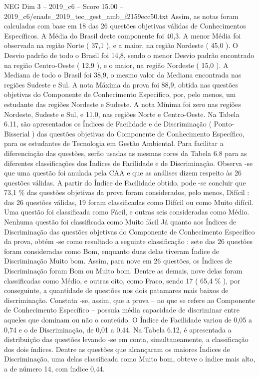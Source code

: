\begin{textsample}{NEG Dim 3 – 2019\_c6 – Score 15.00 – 2019\_c6/enade\_2019\_tec\_gest\_amb\_f2159ecc50.txt}
Assim, as notas foram calculadas com base em 18 das 26 questões objetivas válidas de Conhecimentos Específicos.
A Média do Brasil deste componente foi 40,3.
A menor Média foi observada na região Norte ( 37,1 ), e a maior, na região Nordeste ( 45,0 ).
O Desvio padrão de todo o Brasil foi 14,8, sendo o menor Desvio padrão encontrado na região Centro-Oeste ( 12,9 ), e o maior, na região Nordeste ( 15,0 ).
A Mediana de todo o Brasil foi 38,9, o mesmo valor da Mediana encontrada nas regiões Sudeste e Sul.
A nota Máxima da prova foi 88,9, obtida nas questões objetivas do Componente de Conhecimento Específico, por, pelo menos, um estudante das regiões Nordeste e Sudeste.
A nota Mínima foi zero nas regiões Nordeste, Sudeste e Sul, e 11,0, nas regiões Norte e Centro-Oeste.
Na Tabela 6.11, são apresentados os Índices de Facilidade e de Discriminação ( Ponto-Bisserial ) das questões objetivas do Componente de Conhecimento Específico, para os estudantes de Tecnologia em Gestão Ambiental.
Para facilitar a diferenciação das questões, serão usadas as mesmas cores da Tabela 6.8 para as diferentes classificações dos Índices de Facilidade e de Discriminação.
Observa -se que uma questão foi anulada pela CAA e que as análises dizem respeito às 26 questões válidas.
A partir do Índice de Facilidade obtido, pode -se concluir que 73,1 \% das questões objetivas da prova foram considerados, pelo menos, Difícil : das 26 questões válidas, 19 foram classificadas como Difícil ou como Muito difícil.
Uma questão foi classificada como Fácil, e outras seis consideradas como Médio.
Nenhuma questão foi classificada como Muito fácil Já quanto aos Índices de Discriminação das questões objetivas do Componente de Conhecimento Específico da prova, obtém -se como resultado a seguinte classificação : sete das 26 questões foram consideradas como Bom, enquanto duas delas tiveram Índice de Discriminação Muito bom.
Assim, para nove em 26 questões, os Índices de Discriminação foram Bom ou Muito bom.
Dentre as demais, nove delas foram classificadas como Médio, e outras oito, como Fraco, sendo 17 ( 65,4 \% ), por conseguinte, a quantidade de questões nos dois patamares mais baixos de discriminação.
Constata -se, assim, que a prova – no que se refere ao Componente de Conhecimento Específico – possuía média capacidade de discriminar entre aqueles que dominam ou não o conteúdo.
O Índice de Facilidade variou de 0,05 a 0,74 e o de Discriminação, de 0,01 a 0,44.
Na Tabela 6.12, é apresentada a distribuição das questões levando -se em conta, simultaneamente, a classificação dos dois índices.
Dentre as questões que alcançaram os maiores Índices de Discriminação, uma delas classificada como Muito bom, obteve o índice mais alto, a de número 14, com índice 0,44.

\end{textsample}

